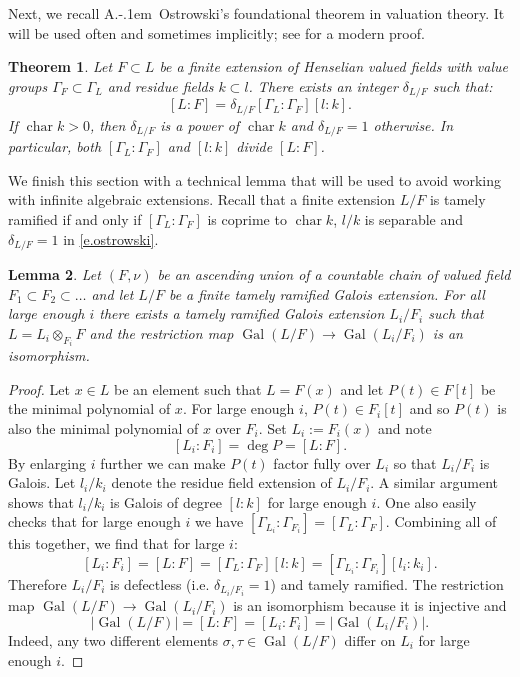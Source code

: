 \documentclass[12pt]{amsart}
\numberwithin{equation}{section}
\newtheorem{theorem}{Theorem}[section]
\newtheorem{lemma}[theorem]{Lemma}
\theoremstyle{definition}
\newcommand{\Gal}{\operatorname{Gal}}
\newcommand{\Char}{\operatorname{char}}
\begin{document}
Next, we recall A.\kern-.1em\ Ostrowski's foundational theorem in valuation theory. It will be used often and sometimes implicitly; see \cite[Theorem 17.2.1]{efrat2006valuations} for a modern proof.
\begin{theorem}{\cite{ostrowski1935untersuchungen}}\label{thm.ostrowski}
    Let $F\subset L$ be a finite extension of Henselian valued fields with value groups $\Gamma_F\subset \Gamma_L$ and residue fields $k\subset l$. There exists an integer $\delta_{L/F}$ such that:
    \begin{equation}\label{e.ostrowski}
        [L:F] = \delta_{L/F} [\Gamma_L:\Gamma_F][l:k] . 
    \end{equation}
    If $\Char k > 0$, then $\delta_{L/F}$ is a power of $\Char k$ and $\delta_{L/F} = 1$ otherwise. In particular, both $[\Gamma_L:\Gamma_F]$ and $[l:k]$ divide $[L:F]$.
\end{theorem}
We finish this section with a technical lemma that will be used to avoid working with infinite algebraic extensions. Recall that a finite extension $L/F$ is tamely ramified if and only if $[\Gamma_L:\Gamma_F]$ is coprime to $\Char k$, $l/k$ is separable and $\delta_{L/F} = 1$ in \eqref{e.ostrowski}.
\begin{lemma}\label{lem.limit_of_ext}
    Let $(F,\nu)$ be an ascending union of a countable chain of valued field $F_1\subset F_2 \subset \dots $  and let $L/F$ be a finite tamely ramified Galois extension. For all large enough $i$ there exists a tamely ramified Galois extension $L_i/F_i$ such that $L = L_i \otimes_{F_i} F$  and the restriction map $\Gal(L/F)\to \Gal(L_i/F_i)$ is an isomorphism. 
\end{lemma}
\begin{proof}
    Let $x\in L$ be an element such that $L = F(x)$ and let $P(t)\in F[t]$ be the minimal polynomial of $x$. For large enough $i$, $P(t)\in F_i[t]$ and so $P(t)$ is also the minimal polynomial of $x$ over $F_i$. Set $L_i := F_i(x)$ and note $$[L_i:F_i] = \deg P =[L:F].$$ By enlarging $i$ further we can make $P(t)$ factor fully over $L_i$ so that $L_i/F_i$ is Galois. Let $l_i/k_i$ denote the residue field extension of $L_i/F_i$. A similar argument shows that $l_i/k_i$ is Galois of degree $[l:k]$ for large enough $i$. One also easily checks that for large enough $i$ we have $[\Gamma_{L_i}:\Gamma_{F_i}] = [\Gamma_L : \Gamma_F]$. Combining all of this together, we find that for large $i$:
    $$[L_i: F_i] = [L:F] = [\Gamma_L:\Gamma_F][l:k] = [\Gamma_{L_i}:\Gamma_{F_i}][l_i:k_i].$$
    Therefore $L_i/F_i$ is defectless (i.e. $\delta_{L_i /F_i} = 1$) and tamely ramified.   The restriction map $\Gal(L/F)\to \Gal(L_i/F_i)$ is an isomorphism because it is injective and $$|\Gal(L/F)|=[L:F] =[L_i :F_i] = |\Gal(L_i/F_i)|.$$
    Indeed, any two different elements $\sigma, \tau\in \Gal(L/F)$ differ on $L_i$ for large enough $i$.
\end{proof}
\end{document}
